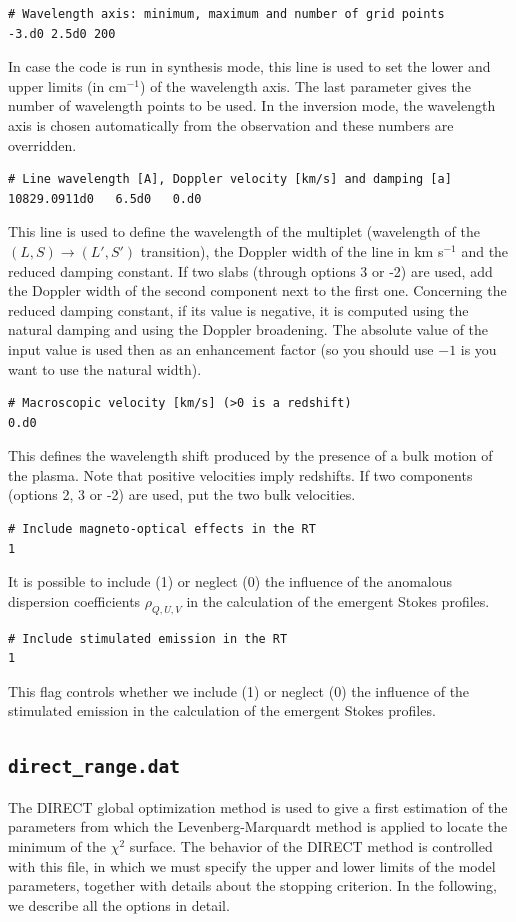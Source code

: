 \documentclass[12pt]{article}
\begin{document}
\begin{verbatim}
# Wavelength axis: minimum, maximum and number of grid points
-3.d0 2.5d0 200
\end{verbatim}
In case the code is run in synthesis mode, this line is used to set the lower and upper
limits (in cm$^{-1}$) of the wavelength axis. The last parameter gives the number of wavelength
points to be used. In the inversion mode, the wavelength axis is chosen automatically from 
the observation and these numbers are overridden.

\begin{verbatim}
# Line wavelength [A], Doppler velocity [km/s] and damping [a]
10829.0911d0   6.5d0   0.d0
\end{verbatim}
This line is used to define the wavelength of the multiplet (wavelength of the 
$(L,S) \to (L',S')$ transition), the Doppler width of the
line in km s$^{-1}$ and the reduced damping constant.
If two slabs (through options 3 or -2) are used, add the Doppler width of the second component
next to the first one.
Concerning the reduced damping constant, if its value is negative, it is computed using the natural
damping and using the Doppler broadening. The absolute value of the input value is used then as
an enhancement factor (so you should use $-1$ is you want to use the natural width).

\begin{verbatim} 
# Macroscopic velocity [km/s] (>0 is a redshift)
0.d0
\end{verbatim}
This defines the wavelength shift produced by the presence of a bulk motion of the plasma.
Note that positive velocities imply redshifts. If two components (options 2, 3 or -2)
are used, put the two bulk velocities.

\begin{verbatim} 
# Include magneto-optical effects in the RT
1
\end{verbatim}
It is possible to include (1) or neglect (0) the influence of the anomalous dispersion coefficients $\rho_{Q,U,V}$
in the calculation of the emergent Stokes profiles.

\begin{verbatim}
# Include stimulated emission in the RT
1
\end{verbatim}
This flag controls whether we include (1) or neglect (0) the influence of the stimulated emission 
in the calculation of the emergent Stokes profiles.

\subsection{\texttt{direct\_range.dat}}
\label{sec:direct_range}
The DIRECT global optimization method is used to give a first estimation of the parameters from
which the Levenberg-Marquardt method is applied to locate the minimum of the $\chi^2$ surface.
The behavior of the DIRECT method is controlled with this file, in which we must specify
the upper and lower limits of the model parameters, together with details about the stopping
criterion. In the following, we describe all the options in detail.
\end{document}
